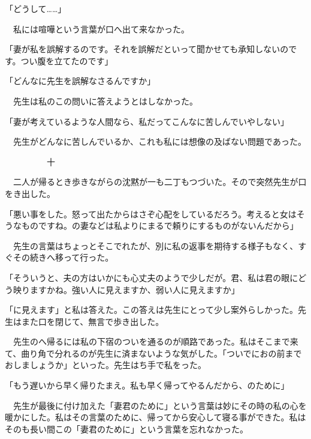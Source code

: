 \documentclass[a4j,onecolumn]{tarticle}
\begin{document}
「どうして……」\par{}
　私には喧嘩という言葉が口へ出て来なかった。\hbox{}\par{}
「妻が私を誤解するのです。\hbox{}それを誤解だといって聞かせても承知しないのです。\hbox{}つい腹を立てたのです」\par{}
「どんなに先生を誤解なさるんですか」\par{}
　先生は私のこの問いに答えようとはしなかった。\hbox{}\par{}
「妻が考えているような人間なら、\hbox{}私だってこんなに苦しんでいやしない」\par{}
　先生がどんなに苦しんでいるか、\hbox{}これも私には想像の及ばない問題であった。\hbox{}\par{}\par{}　　　　　十
\par{}
　二人が帰るとき歩きながらの沈黙が一も二丁もつづいた。\hbox{}そので突然先生が口をき出した。\hbox{}\par{}
「悪い事をした。\hbox{}怒って出たからはさぞ心配をしているだろう。\hbox{}考えると女はそうなものですね。\hbox{}の妻などは私よりにまるで頼りにするものがないんだから」\par{}
　先生の言葉はちょっとそこでれたが、\hbox{}別に私の返事を期待する様子もなく、\hbox{}すぐその続きへ移って行った。\hbox{}\par{}
「そういうと、\hbox{}夫の方はいかにも心丈夫のようで少しだが。\hbox{}君、\hbox{}私は君の眼にどう映りますかね。\hbox{}強い人に見えますか、\hbox{}弱い人に見えますか」\par{}
「に見えます」と私は答えた。\hbox{}この答えは先生にとって少し案外らしかった。\hbox{}先生はまた口を閉じて、\hbox{}無言で歩き出した。\hbox{}\par{}
　先生のへ帰るには私の下宿のついを通るのが順路であった。\hbox{}私はそこまで来て、\hbox{}曲り角で分れるのが先生に済まないような気がした。\hbox{}「ついでにおの前までおしましょうか」といった。\hbox{}先生はち手で私をった。\hbox{}\par{}
「もう遅いから早く帰りたまえ。\hbox{}私も早く帰ってやるんだから、\hbox{}のために」\par{}
　先生が最後に付け加えた「妻君のために」という言葉は妙にその時の私の心を暖かにした。\hbox{}私はその言葉のために、\hbox{}帰ってから安心して寝る事ができた。\hbox{}私はそのも長い間この「妻君のために」という言葉を忘れなかった。\hbox{}\par{}
\end{document}
